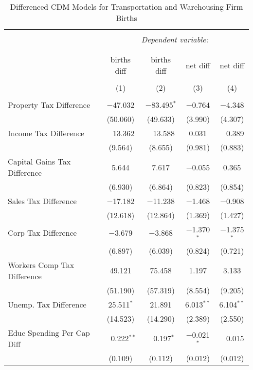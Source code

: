
\begin{table}[!htbp] \centering 
  \caption{Differenced CDM Models for  Transportation and Warehousing Firm Births} 
  \label{} 
\begin{tabular}{@{\extracolsep{5pt}}lcccc} 
\\[-1.8ex]\hline 
\hline \\[-1.8ex] 
 & \multicolumn{4}{c}{\textit{Dependent variable:}} \\ 
\cline{2-5} 
\\[-1.8ex] & \multicolumn{4}{c}{ } \\ 
 & births diff & births diff & net diff & net diff \\ 
\\[-1.8ex] & (1) & (2) & (3) & (4)\\ 
\hline \\[-1.8ex] 
 Property Tax Difference & $-$47.032 & $-$83.495$^{*}$ & $-$0.764 & $-$4.348 \\ 
  & (50.060) & (49.633) & (3.990) & (4.307) \\ 
  Income Tax Difference & $-$13.362 & $-$13.588 & 0.031 & $-$0.389 \\ 
  & (9.564) & (8.655) & (0.981) & (0.883) \\ 
  Capital Gains Tax Difference & 5.644 & 7.617 & $-$0.055 & 0.365 \\ 
  & (6.930) & (6.864) & (0.823) & (0.854) \\ 
  Sales Tax Difference & $-$17.182 & $-$11.238 & $-$1.468 & $-$0.908 \\ 
  & (12.618) & (12.864) & (1.369) & (1.427) \\ 
  Corp Tax Difference & $-$3.679 & $-$3.868 & $-$1.370$^{*}$ & $-$1.375$^{*}$ \\ 
  & (6.897) & (6.039) & (0.824) & (0.721) \\ 
  Workers Comp Tax Difference & 49.121 & 75.458 & 1.197 & 3.133 \\ 
  & (51.190) & (57.319) & (8.554) & (9.205) \\ 
  Unemp. Tax Difference & 25.511$^{*}$ & 21.891 & 6.013$^{**}$ & 6.104$^{**}$ \\ 
  & (14.523) & (14.290) & (2.389) & (2.550) \\ 
  Educ Spending Per Cap Diff & $-$0.222$^{**}$ & $-$0.197$^{*}$ & $-$0.021$^{*}$ & $-$0.015 \\ 
  & (0.109) & (0.112) & (0.012) & (0.012) \\ 

\end{tabular}
\end{table}
